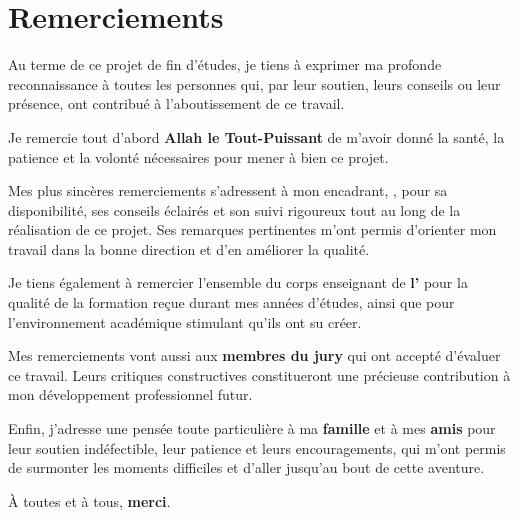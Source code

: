 \chapter*{Remerciements}
\thispagestyle{empty}

Au terme de ce projet de fin d'études, je tiens à exprimer ma profonde
reconnaissance à toutes les personnes qui, par leur soutien, leurs conseils
ou leur présence, ont contribué à l'aboutissement de ce travail.

\vspace{0.6em}

Je remercie tout d'abord \textbf{Allah le Tout-Puissant} de m'avoir donné
la santé, la patience et la volonté nécessaires pour mener à bien ce projet.

\vspace{0.6em}

Mes plus sincères remerciements s'adressent à mon encadrant,
\textbf{\supervisor}, pour sa disponibilité, ses conseils éclairés et son
suivi rigoureux tout au long de la réalisation de ce projet. Ses
remarques pertinentes m'ont permis d'orienter mon travail dans la bonne
direction et d'en améliorer la qualité.

\vspace{0.6em}

Je tiens également à remercier l'ensemble du corps enseignant de
\textbf{l'\Institute} pour la qualité de la formation reçue durant mes
années d'études, ainsi que pour l'environnement académique stimulant
qu'ils ont su créer.

\vspace{0.6em}

Mes remerciements vont aussi aux \textbf{membres du jury} qui ont accepté
d'évaluer ce travail. Leurs critiques constructives constitueront une
précieuse contribution à mon développement professionnel futur.

\vspace{0.6em}

Enfin, j'adresse une pensée toute particulière à ma \textbf{famille} et à
mes \textbf{amis} pour leur soutien indéfectible, leur patience et leurs
encouragements, qui m'ont permis de surmonter les moments difficiles et
d'aller jusqu'au bout de cette aventure.

\vspace{1em}

À toutes et à tous, \textbf{merci}.
